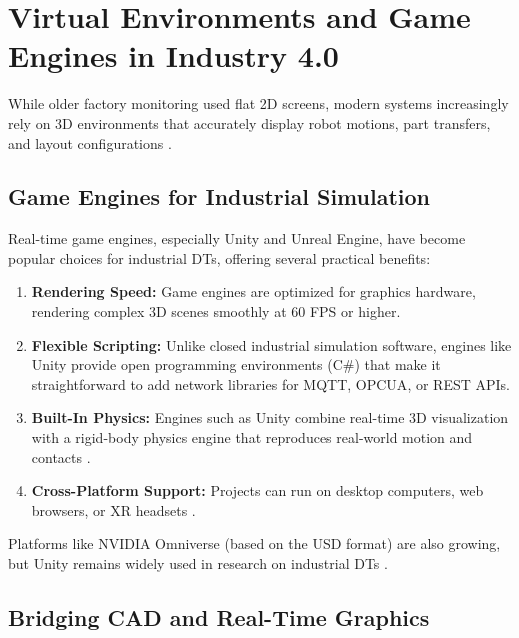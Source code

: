 \section{Virtual Environments and Game Engines in Industry 4.0}
\label{sec:game_engines_vc}

While older factory monitoring used flat 2D screens, modern systems increasingly rely on 3D environments that accurately display robot motions, part transfers, and layout configurations \cite{Pajpach2022,Zheng2024}.

\subsection{Game Engines for Industrial Simulation}

Real-time game engines, especially Unity and Unreal Engine, have become popular choices for industrial \glspl{DT}, offering several practical benefits:
\begin{enumerate}
    \item \textbf{Rendering Speed:} Game engines are optimized for graphics hardware, rendering complex 3D scenes smoothly at 60 \gls{FPS} or higher.
    \item \textbf{Flexible Scripting:} Unlike closed industrial simulation software, engines like Unity provide open programming environments (C\#) that make it straightforward to add network libraries for \gls{MQTT}, \gls{OPCUA}, or \gls{REST} \glspl{API}.
    \item \textbf{Built-In Physics:} Engines such as Unity combine real-time 3D visualization with a rigid-body physics engine that reproduces real-world motion and contacts \cite{Pajpach2022}.
    \item \textbf{Cross-Platform Support:} Projects can run on desktop computers, web browsers, or \gls{XR} headsets \cite{Garcia2025}.
\end{enumerate}

Platforms like NVIDIA Omniverse (based on the \gls{USD} format) are also growing, but Unity remains widely used in research on industrial \glspl{DT} \cite{Alexopoulos2025,Garcia2025,Pajpach2023}.

\subsection{Bridging \texorpdfstring{\gls{CAD}}{CAD} and Real-Time Graphics}

